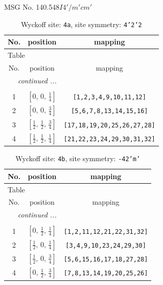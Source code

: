 \documentclass[fleqn,8pt]{jsarticle}
\begin{document}
\setcounter{MaxMatrixCols}{32}

\renewcommand{\tablename}{Table~}
\renewcommand{\figurename}{Figure~}
\begin{center}
\LARGE
MSG No. 140.548\quad$I4'/m'cm'$
\end{center}
\renewcommand{\arraystretch}{1.2}
\begin{longtable}{ccc}
\caption{Wyckoff site: {\tt 4a}, site symmetry: {\tt 4'2'2}}
 \\
 \hline \hline
No. & position & mapping \\ \hline \endfirsthead

\multicolumn{2}{l}{\tablename\ \thetable{}} \\
 \hline \hline
No. & position & mapping \\ \hline \endhead

 \hline \hline
\multicolumn{2}{r}{\footnotesize\it continued ...} \\ \endfoot

 \hline \hline
\multicolumn{2}{r}{} \\ \endlastfoot

1 & $\left[ 0,\, 0,\, \frac{1}{4} \right]$ & {\tt [1,2,3,4,9,10,11,12]} \\ \hline
2 & $\left[ 0,\, 0,\, \frac{3}{4} \right]$ & {\tt [5,6,7,8,13,14,15,16]} \\ \hline
3 & $\left[ \frac{1}{2},\, \frac{1}{2},\, \frac{3}{4} \right]$ & {\tt [17,18,19,20,25,26,27,28]} \\ \hline
4 & $\left[ \frac{1}{2},\, \frac{1}{2},\, \frac{1}{4} \right]$ & {\tt [21,22,23,24,29,30,31,32]} \\
\end{longtable}
\renewcommand{\arraystretch}{1.2}
\begin{longtable}{ccc}
\caption{Wyckoff site: {\tt 4b}, site symmetry: {\tt -42'm'}}
 \\
 \hline \hline
No. & position & mapping \\ \hline \endfirsthead

\multicolumn{2}{l}{\tablename\ \thetable{}} \\
 \hline \hline
No. & position & mapping \\ \hline \endhead

 \hline \hline
\multicolumn{2}{r}{\footnotesize\it continued ...} \\ \endfoot

 \hline \hline
\multicolumn{2}{r}{} \\ \endlastfoot

1 & $\left[ 0,\, \frac{1}{2},\, \frac{1}{4} \right]$ & {\tt [1,2,11,12,21,22,31,32]} \\ \hline
2 & $\left[ \frac{1}{2},\, 0,\, \frac{1}{4} \right]$ & {\tt [3,4,9,10,23,24,29,30]} \\ \hline
3 & $\left[ \frac{1}{2},\, 0,\, \frac{3}{4} \right]$ & {\tt [5,6,15,16,17,18,27,28]} \\ \hline
4 & $\left[ 0,\, \frac{1}{2},\, \frac{3}{4} \right]$ & {\tt [7,8,13,14,19,20,25,26]} \\
\end{longtable}
\end{document}
